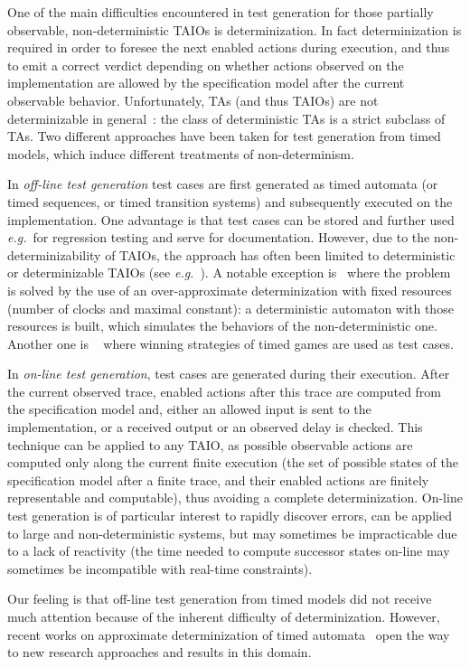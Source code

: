 \documentclass{LMCS}
\theoremstyle{plain}\newtheorem{proposition}[thm]{Proposition}
\def\eg{{\em e.g.}}
\begin{document}
One of the main difficulties encountered in test generation for those
partially observable, non-deterministic TAIOs is determinization.
In fact determinization 
is required in order to foresee the next enabled actions during
execution, and thus to emit a correct verdict depending on whether 
actions observed on the implementation 
are allowed by the specification model after the current observable behavior.
Unfortunately, TAs (and thus TAIOs) are not determinizable in general~\cite{AlurDill94}: the class of deterministic TAs is a strict subclass of TAs. 
Two different approaches have been taken for test generation from timed models,
which induce different treatments of non-determinism. 
\begin{iteMize}{}
\item 
In {\em off-line test generation} test cases are first generated as
timed automata (or timed sequences, or timed transition systems) 
and subsequently
executed on the implementation.  One advantage is that test cases can
be stored and further used \eg~for regression testing and serve for
documentation.  However, due to the non-determinizability of TAIOs,
the approach has often been limited to deterministic or determinizable TAIOs 
(see \eg~\cite{KhoumsiJeronMarchand-FATES03,NielsenSkou-STTT03}).
A notable exception is~\cite{KrichenTripakis09} where the problem is solved by the
use of an over-approximate determinization with fixed resources 
(number of clocks and maximal constant): 
a deterministic automaton with those resources is built, 
which simulates the behaviors of the non-deterministic one.
Another one is 
~\cite{DavidLarsenLiNielsen-ICST09} where winning strategies of
 timed games are used as test cases.
\item In {\em on-line test generation}, test cases are generated
  during their execution.  After the current observed trace, enabled
  actions after this trace are computed from the specification model
  and, either an allowed input is sent to the implementation, or a
  received output or an observed delay is checked.  This technique can
  be applied to any TAIO, as possible observable actions are computed
  only along the current finite execution (the set of possible states
  of the specification model after a finite trace, and their enabled
  actions are finitely representable and computable), thus
  avoiding a complete determinization.  On-line test generation is of
  particular interest to rapidly discover errors, can be applied
    to large and non-deterministic systems, but may sometimes be
  impracticable due to a lack of reactivity (the time needed to
  compute successor states on-line may sometimes be incompatible with
  real-time constraints).
\end{iteMize}
Our feeling is that off-line test generation from timed models 
did not receive much attention because of the inherent difficulty 
of determinization. 
However, recent works on approximate determinization of timed automata~\cite{KrichenTripakis09,BertrandStainerJeronKrichen-FOSSACS2011} 
open the way to new research approaches and results in this domain.
\end{document}
